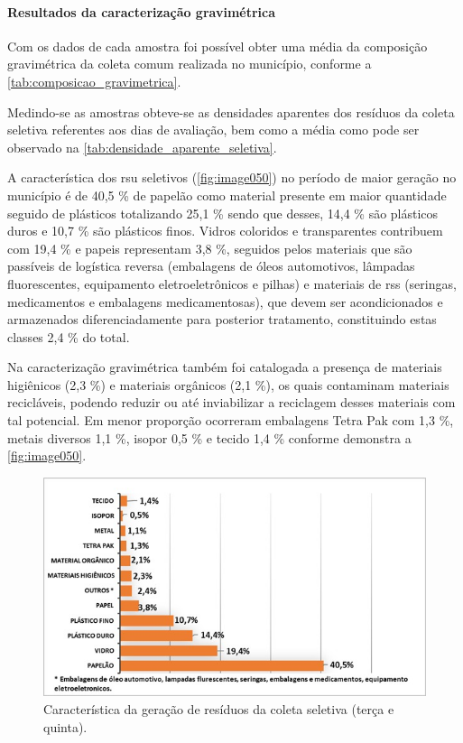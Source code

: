 

\paragraph{\textbf{Resultados da caracterização gravimétrica}}

Com os dados de cada amostra foi possível obter uma média da composição gravimétrica da coleta comum realizada no município, conforme a \autoref{tab:composicao_gravimetrica}.



Medindo-se as amostras obteve-se as densidades aparentes dos resíduos da coleta seletiva referentes aos dias de avaliação, bem como a média como pode ser observado na \autoref{tab:densidade_aparente_seletiva}.



A característica dos \gls{rsu} seletivos (\autoref{fig:image050}) no período de maior geração no município é de 40,5 \% de papelão como material presente em maior quantidade seguido de plásticos totalizando 25,1 \% sendo que desses, 14,4 \% são plásticos duros e 10,7 \% são plásticos finos. Vidros coloridos e transparentes contribuem com 19,4 \% e papeis representam 3,8 \%, seguidos pelos materiais que são passíveis de logística reversa (embalagens de óleos automotivos, lâmpadas fluorescentes, equipamento eletroeletrônicos e pilhas) e materiais de \gls{rss} (seringas, medicamentos e embalagens medicamentosas), que devem ser acondicionados e armazenados diferenciadamente para posterior tratamento, constituindo estas classes 2,4 \% do total. 

Na caracterização gravimétrica também foi catalogada a presença de materiais higiênicos (2,3 \%) e materiais orgânicos (2,1 \%), os quais contaminam materiais recicláveis, podendo reduzir ou até inviabilizar a reciclagem desses materiais com tal potencial. Em menor proporção ocorreram embalagens Tetra Pak com 1,3 \%, metais diversos 1,1 \%, isopor 0,5 \% e tecido 1,4 \% conforme demonstra a \autoref{fig:image050}.

\begin{figure}
	\centering
	\includegraphics[width=0.75\linewidth]{produtos/prodtres/image050}
	\caption{Característica da geração de resíduos da coleta seletiva (terça e quinta).}
	\label{fig:image050}
\end{figure}


